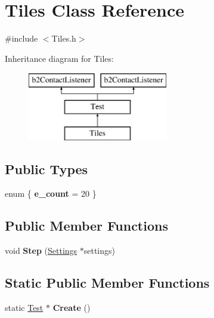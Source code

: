 \hypertarget{class_tiles}{\section{Tiles Class Reference}
\label{class_tiles}
}


{\ttfamily \#include $<$Tiles.\-h$>$}

Inheritance diagram for Tiles\-:\begin{figure}[H]
\begin{center}
\leavevmode
\includegraphics[height=3.000000cm]{class_tiles}
\end{center}
\end{figure}
\subsection*{Public Types}
\begin{DoxyCompactItemize}
\item 
enum \{ {\bfseries e\-\_\-count} =  20
 \}
\end{DoxyCompactItemize}
\subsection*{Public Member Functions}
\begin{DoxyCompactItemize}
\item 
\hypertarget{class_tiles_a4aac010d0862b737a916d216a0d3c0ce}{void {\bfseries Step} (\hyperlink{struct_settings}{Settings} $\ast$settings)}\label{class_tiles_a4aac010d0862b737a916d216a0d3c0ce}

\end{DoxyCompactItemize}
\subsection*{Static Public Member Functions}
\begin{DoxyCompactItemize}
\item 
\hypertarget{class_tiles_a261c4453e81eb4c252a793a3e8c4142e}{static \hyperlink{class_test}{Test} $\ast$ {\bfseries Create} ()}\label{class_tiles_a261c4453e81eb4c252a793a3e8c4142e}

\end{DoxyCompactItemize}
